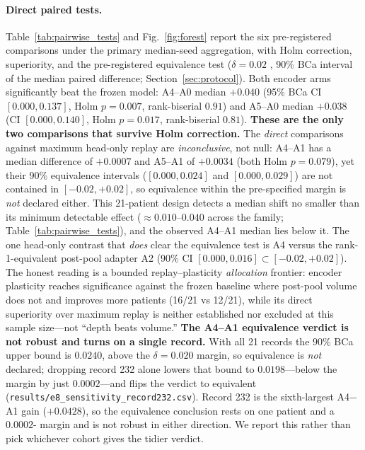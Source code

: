 \paragraph{Direct paired tests.} Table~\ref{tab:pairwise_tests} and
Fig.~\ref{fig:forest} report the six pre-registered comparisons under the primary
median-seed aggregation, with Holm correction, superiority, and the
pre-registered equivalence test ($\delta = 0.02$ \macrof{}, 90\% BCa interval of
the median paired difference; Section~\ref{sec:protocol}). Both encoder arms
significantly beat the frozen model: A4--A0 median $+0.040$ (95\% BCa CI
$[0.000,0.137]$, Holm $p=0.007$, rank-biserial $0.91$) and A5--A0 median $+0.038$
(CI $[0.000,0.140]$, Holm $p=0.017$, rank-biserial $0.81$). \textbf{These are the
only two comparisons that survive Holm correction.} The \emph{direct} comparisons
against maximum head-only replay are \emph{inconclusive}, not null: A4--A1 has a
median difference of $+0.0007$ and A5--A1 of $+0.0034$ (both Holm $p=0.079$), yet
their 90\% equivalence intervals ($[0.000,0.024]$ and $[0.000,0.029]$) are not
contained in $[-0.02,+0.02]$, so equivalence within the pre-specified margin is
\emph{not} declared either. This 21-patient design detects a median shift no
smaller than its minimum detectable effect ($\approx 0.010$--$0.040$ \macrof{}
across the family; Table~\ref{tab:pairwise_tests}), and the observed A4--A1
median lies below it. The one head-only contrast that \emph{does} clear the
equivalence test is A4 versus the rank-1-equivalent post-pool adapter A2 (90\% CI
$[0.000,0.016] \subset [-0.02,+0.02]$). The honest reading is a bounded
replay--plasticity \emph{allocation} frontier: encoder plasticity reaches
significance against the frozen baseline where post-pool volume does not and
improves more patients (16/21 vs 12/21), while its direct superiority over
maximum replay is neither established nor excluded at this sample size---not
``depth beats volume.'' \textbf{The A4--A1 equivalence verdict is not robust and
turns on a single record.} With all 21 records the $90\%$ BCa upper bound is
$0.0240$, above the $\delta = 0.020$ margin, so equivalence is \emph{not}
declared; dropping record 232 alone lowers that bound to $0.0198$---below the
margin by just $0.0002$---and flips the verdict to equivalent
(\texttt{results/e8\_sensitivity\_record232.csv}). Record 232 is the
sixth-largest A4$-$A1 gain ($+0.0428$), so the equivalence conclusion rests on one
patient and a $0.0002$-\macrof{} margin and is not robust in either direction. We
report this rather than pick whichever cohort gives the tidier verdict.

